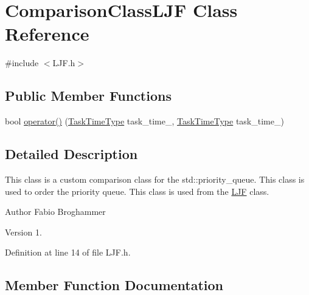 \hypertarget{class_comparison_class_l_j_f}{}\section{Comparison\+Class\+L\+J\+F Class Reference}
\label{class_comparison_class_l_j_f}


{\ttfamily \#include $<$L\+J\+F.\+h$>$}

\subsection*{Public Member Functions}
\begin{DoxyCompactItemize}
\item 
bool \hyperlink{class_comparison_class_l_j_f_a0e49bbee2ff869b1b2b31ad9e9a863d0}{operator()} (\hyperlink{_scheduling_strategy_8h_a3fb457f0594d33676e56256c3403e52b}{Task\+Time\+Type} task\+\_\+time\+\_, \hyperlink{_scheduling_strategy_8h_a3fb457f0594d33676e56256c3403e52b}{Task\+Time\+Type} task\+\_\+time\+\_)
\end{DoxyCompactItemize}


\subsection{Detailed Description}
This class is a custom comparison class for the std\+::priority\+\_\+queue. This class is used to order the priority queue. This class is used from the \hyperlink{class_l_j_f}{L\+J\+F} class.

\begin{DoxyAuthor}{Author}
Fabio Broghammer 
\end{DoxyAuthor}
\begin{DoxyVersion}{Version}
1. 
\end{DoxyVersion}


Definition at line 14 of file L\+J\+F.\+h.



\subsection{Member Function Documentation}
\hypertarget{class_comparison_class_l_j_f_a0e49bbee2ff869b1b2b31ad9e9a863d0}{}
